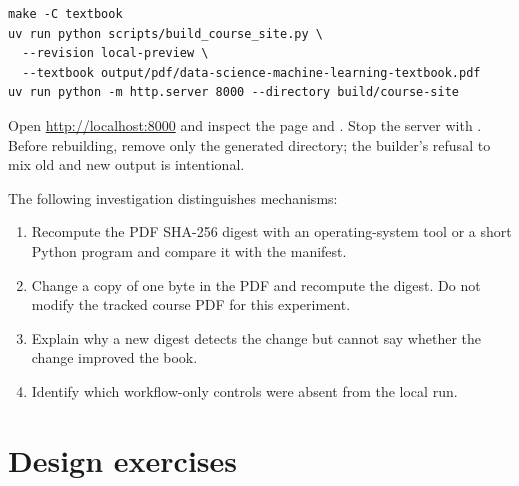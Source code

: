 \begin{lstlisting}[numbers=none]
make -C textbook
uv run python scripts/build_course_site.py \
  --revision local-preview \
  --textbook output/pdf/data-science-machine-learning-textbook.pdf
uv run python -m http.server 8000 --directory build/course-site
\end{lstlisting}

Open \url{http://localhost:8000} and inspect the page and
. Stop the server with . Before rebuilding,
remove only the generated \code{build/course-site/} directory; the builder's
refusal to mix old and new output is intentional.

The following investigation distinguishes mechanisms:

\begin{enumerate}
  \item Recompute the PDF SHA-256 digest with an operating-system tool or a
  short Python program and compare it with the manifest.
  \item Change a copy of one byte in the PDF and recompute the digest. Do not
  modify the tracked course PDF for this experiment.
  \item Explain why a new digest detects the change but cannot say whether the
  change improved the book.
  \item Identify which workflow-only controls were absent from the local run.
\end{enumerate}

\section{Design exercises}

